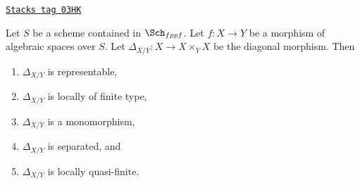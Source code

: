 \begin{lemma}
\label{spaces-morphisms-lemma-properties-diagonal}
\href{https://stacks.math.columbia.edu/tag/03HK}{\texttt{Stacks tag 03HK}}

Let $S$ be a scheme contained in $\Sch_{fppf}$.
Let $f : X \to Y$ be a morphism of algebraic spaces over $S$.
Let $\Delta_{X/Y} : X \to X \times_Y X$ be the diagonal morphism.
Then
\begin{enumerate}
\item $\Delta_{X/Y}$ is representable,
\item $\Delta_{X/Y}$ is locally of finite type,
\item $\Delta_{X/Y}$ is a monomorphism,
\item $\Delta_{X/Y}$ is separated, and
\item $\Delta_{X/Y}$ is locally quasi-finite.
\end{enumerate}
\end{lemma}

